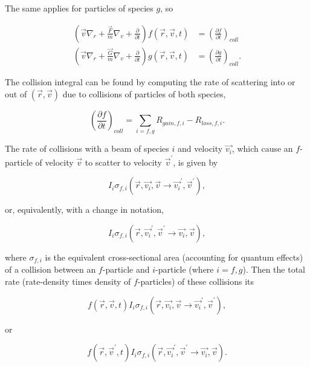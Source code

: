 \documentclass{hw-template}
\begin{document}
The same applies for particles of species $g$, so 

\begin{align}
    \left(\vec{v} \nabla_r + \frac{\vec{F}}{m} \nabla_v  +\frac{\partial}{\partial t} \right)f\left(\vec{r}, \vec{v}, t \right)&=  \left( \frac{\partial f}{\partial t}\right)_{coll}\\
    \left(\vec{v} \nabla_r + \frac{\vec{G}}{m} \nabla_v  +\frac{\partial}{\partial t} \right)g\left(\vec{r}, \vec{v}, t \right)&=  \left( \frac{\partial g}{\partial t}\right)_{coll}.
\end{align}

The collision integral can be found by computing the rate of scattering into or out of $(\vec{r}, \vec{v})$ due to collisions of particles of both species, 

\begin{equation}
    \left( \frac{\partial f}{\partial t}\right)_{coll} = \sum_{i= f, g} R_{gain, f, i} - R_{loss, f, i}.
\end{equation}

The rate of collisions with a beam of species $i$ and velocity $\vec{v_i}$, which cause an $f$-particle of velocity $\vec{v}$ to scatter to velocity $\vec{v}^\prime$, is given by

\begin{equation}
    I_i \sigma_{f, i}(\vec{r}, \vec{v_i}, \vec{v} \rightarrow \vec{v_i}^\prime, \vec{v}^\prime),
\end{equation}

or, equivalently, with a change in notation,

\begin{equation}
    I_i \sigma_{f, i}(\vec{r}, \vec{v_i}^\prime, \vec{v}^\prime \rightarrow \vec{v_i}, \vec{v}),
\end{equation}

where $\sigma_{f, i}$ is the equivalent cross-sectional area (accounting for quantum effects) of a collision between an $f$-particle and $i$-particle (where $i = f, g$). Then the total rate (rate-density times density of $f$-particles) of these collisions its

\begin{equation}
    f(\vec{r}, \vec{v}, t) I_i \sigma_{f, i}(\vec{r}, \vec{v_i}, \vec{v} \rightarrow \vec{v_i}^\prime, \vec{v}^\prime),
\end{equation}

or

\begin{equation}
    f(\vec{r}, \vec{v}^\prime, t)I_i \sigma_{f, i}(\vec{r}, \vec{v_i}^\prime, \vec{v}^\prime \rightarrow \vec{v_i}, \vec{v}).
\end{equation}
\end{document}

